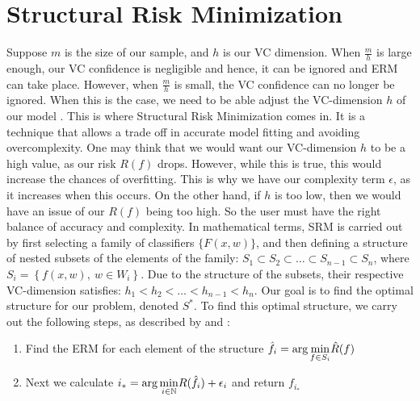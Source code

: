 \section {Structural Risk Minimization} \label{sec:srm}

Suppose $m$ is the size of our sample, and $h$ is our VC dimension. When $\frac{m}{h}$ is large enough, our VC confidence is negligible and hence, it can be ignored and ERM can take place. However, when $\frac{m}{h}$ is small, the VC confidence can no longer be ignored. When this is the case, we need to be able adjust the VC-dimension $h$ of our model \citep{srmvapnik506}. This is where Structural Risk Minimization comes in. It is a technique that allows a trade off in accurate model fitting and avoiding overcomplexity. One may think that we would want our VC-dimension $h$ to be a high value, as our risk $R(f)$ drops. However, while this is true, this would increase the chances of overfitting. This is why we have our complexity term $\epsilon$, as it increases when this occurs. On the other hand, if $h$ is too low, then we would have an issue of our $R(f)$ being too high. So the user must have the right balance of accuracy and complexity.
\newline
In mathematical terms, SRM is carried out by first selecting a family of classifiers $\{F(x,w)\}$, and then defining a structure of nested subsets of the elements of the family: $S_{1}\subset S_{2}\subset\ldots\subset S_{n-1}\subset S_{n}$, where $S_{i}=\left\{ f(x,w),\:w\in W_{i}\right\} $. Due to the structure of the subsets, their respective VC-dimension satisfies: $h_{1}<h_{2}<\ldots<h_{n-1}<h_{n}$. Our goal is to find the optimal structure for our problem, denoted $S^{*}$.
\newline
\newline
To find this optimal structure, we carry out the following steps, as described by \citet{srmvapnik506} and \citet{srmsewell}:

\begin{enumerate}
\item Find the ERM for each element of the structure $\hat{f_{i}}=\mathrm{arg\,\underset{\mathnormal{f}\in \mathnormal{S_{i}}}{min}}\hat{R}(f)$
\item Next we calculate $i_{*}={\mathrm{{arg\,\underset{\mathnormal{i}\in\mathbb{N}}{min}}}}R(\hat{f_{i}})+\epsilon_{i}$
and return $f_{i_{*}}$
\end{enumerate}

